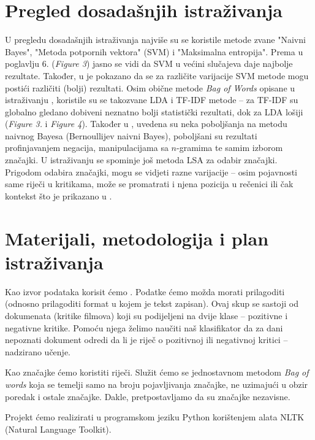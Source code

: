 \documentclass[12pt,a4paper,titlepage]{article}
\begin{document}
\section{Pregled dosadašnjih istraživanja}

U pregledu dosadašnjih istraživanja najviše su se koristile metode zvane "Naivni Bayes", "Metoda potpornih vektora" (\textsc{SVM}) i "Maksimalna entropija". Prema \cite{Pang:2002:TUS:1118693.1118704} u poglavlju 6. (\textit{Figure 3}) jasno se vidi da \textsc{SVM} u većini slučajeva daje najbolje rezultate. Također, u \cite{stan} je pokazano da se za različite varijacije \textsc{SVM} metode mogu postići različiti (bolji) rezultati. Osim obične metode \textit{Bag of Words} opisane u istraživanju \cite{stan}, koristile su se takozvane \textsc{LDA} i \textsc{TF-IDF} metode -- za \textsc{TF-IDF} su globalno gledano dobiveni neznatno bolji statistički rezultati, dok za \textsc{LDA} lošiji (\textit{Figure 3.} i \textit{Figure 4}). Također u \cite{SaLAD:LAS}, uvedena su neka poboljšanja na metodu naivnog Bayesa (Bernoullijev naivni Bayes), poboljšani su rezultati profinjavanjem negacija, manipulacijama sa $n$-gramima te samim izborom značajki. U istraživanju \cite{maas-EtAl:2011:ACL-HLT2011} se spominje još metoda \textsc{LSA} za odabir značajki. Prigodom odabira značajki, mogu se vidjeti razne varijacije -- osim pojavnosti same riječi u kritikama, može se promatrati i njena pozicija u rečenici ili čak kontekst što je prikazano u \cite{Pang:2002:TUS:1118693.1118704}.

\section{Materijali, metodologija i plan istraživanja}

Kao izvor podataka korisit ćemo \cite{dataset}. Podatke ćemo možda morati prilagoditi (odnosno prilagoditi format u kojem je tekst zapisan). Ovaj skup se sastoji od dokumenata (kritike filmova) koji su podijeljeni na dvije klase -- pozitivne i negativne kritike. Pomoću njega želimo naučiti naš klasifikator da za dani nepoznati dokument odredi da li je riječ o pozitivnoj ili negativnoj kritici -- nadzirano učenje.

Kao značajke ćemo koristiti riječi. Služit ćemo se jednostavnom metodom \textit{Bag of words} koja se temelji samo na broju pojavljivanja značajke, ne uzimajući u obzir poredak i ostale značajke. Dakle, pretpostavljamo da su značajke nezavisne.

Projekt ćemo realizirati u programskom jeziku Python korištenjem alata NLTK (Natural Language Toolkit). 
\end{document}
